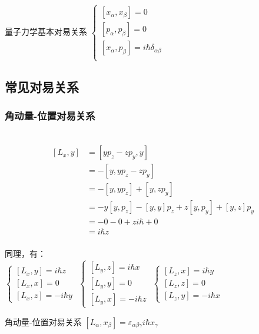 \begin{frame}  
    \begin{atcbox}{量子力学基本对易关系}
    $\begin{cases}
        [x_\alpha,x_\beta]= 0  \\ 
        [p_\alpha,p_\beta]= 0  \\ 
        [x_\alpha,p_\beta]= i\hbar \delta_{\alpha\beta}  \\ 
    \end{cases}$
    \end{atcbox}
\end{frame} 

\subsection{常见对易关系}

\begin{frame}
    \frametitle{角动量-位置对易关系}
    \证~ 
    \begin{equation*}
        \begin{split}
        [L_x,y]&= [yp_z-zp_y,y]\\
        &=-[y,yp_z-zp_y]\\
        &= -[y,yp_z] + [y,zp_y]\\
        &=-y[y,p_z] -[y,y]p_z + z[y,p_y] + [y,z]p_y\\
        &=-0 -0 + z i\hbar + 0\\
        &=i\hbar z \\
        \end{split}  
    \end{equation*}
\end{frame} 

\begin{frame}

    同理，有：\\
    $\begin{cases}
        [L_x,y]= i\hbar z  \\ 
        [L_x,x]= 0  \\ 
        [L_x,z]= -i\hbar y 
    \end{cases}$
    $\begin{cases}
        [L_y,z]= i\hbar x  \\ 
        [L_y,y]= 0  \\ 
        [L_y,x]= -i\hbar z 
    \end{cases}$
    $\begin{cases}
        [L_z,x]= i\hbar y  \\ 
        [L_z,z]= 0  \\ 
        [L_z,y]= -i\hbar x 
    \end{cases}$
    \begin{atcbox}{角动量-位置对易关系}
        $ [L_\alpha,x_\beta]= \varepsilon_{\alpha\beta\gamma} i\hbar x_\gamma $ 
    \end{atcbox}
\end{frame} 

